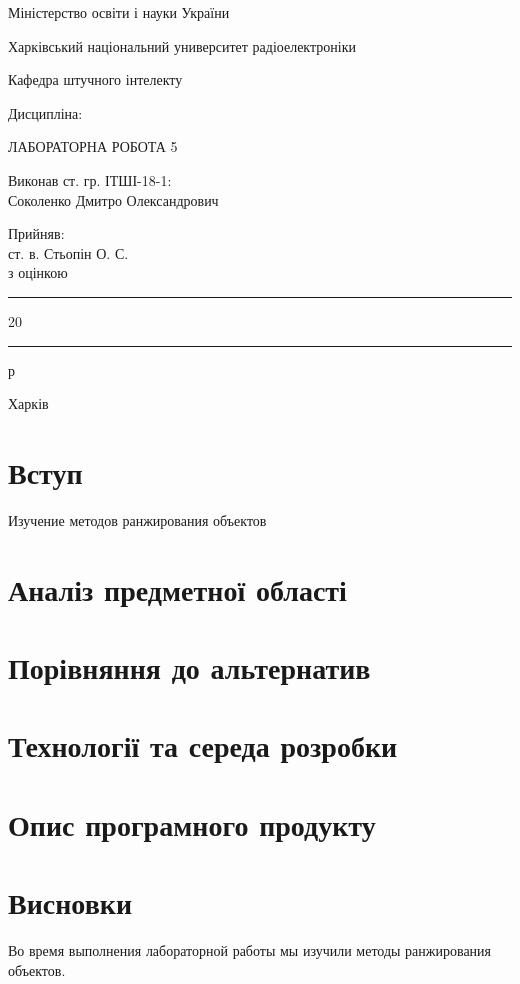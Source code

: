 \documentclass[a4paper,14pt]{extarticle}
\begin{document}
\begin{titlepage}
	\centering
    Міністерство освіти і науки України
    
    Харківський національний университет радіоелектроніки

    \vspace{1cm}
    Кафедра штучного інтелекту

    \vspace{2cm}
    Дисципліна: 

    \vspace{2cm}
    \uppercase{Лабораторна робота 5}

    
    \uppercase{}

    \vspace{4cm}
    \begin{minipage}[t]{10cm}
        Виконав ст. гр. ІТШІ-18-1:\\
        Соколенко Дмитро Олександрович
    \end{minipage}
    \hfill
    \begin{minipage}[t]{6cm}
        Прийняв:\\
        ст. в. Стьопін О. С.\\
        з оцінкою \say{\rule{2cm}{0.15mm}}\\
        \say{\rule{0.7cm}{0.15mm}}\rule{2cm}{0.15mm}20\rule{0.7cm}{0.15mm}р
    \end{minipage}

	\vfill

	{Харків \the\year{}}
\end{titlepage}
\section*{Вступ}
Изучение методов ранжирования объектов

\section{Аналіз предметної області}

\section{Порівняння до альтернатив}

\section{Технології та середа розробки}

\section{Опис програмного продукту}

\section*{Висновки}
Во время выполнения лабораторной работы мы 
изучили методы ранжирования объектов.
\end{document}
